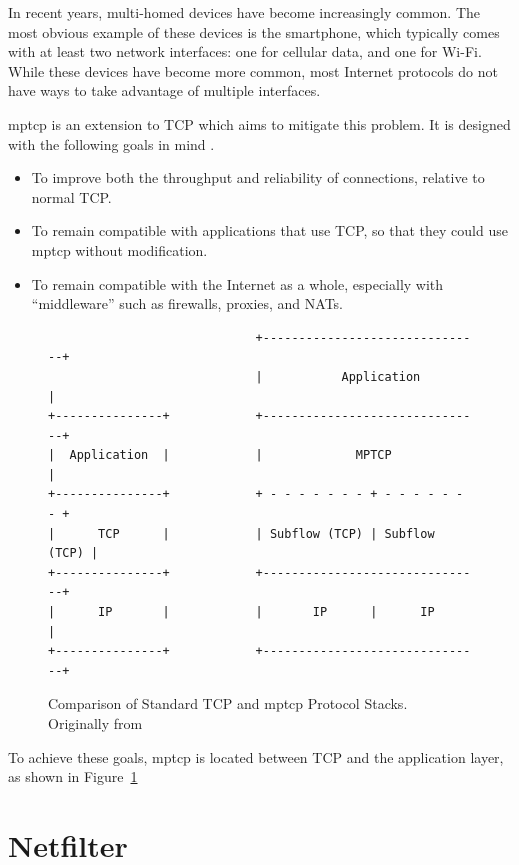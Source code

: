 \documentclass{cwru}
\begin{document}
In recent years, multi-homed devices have become increasingly common. The most
obvious example of these devices is the smartphone, which typically comes with
at least two network interfaces: one for cellular data, and one for Wi-Fi. While
these devices have become more common, most Internet protocols do not have ways
to take advantage of multiple interfaces.

\ac{mptcp} is an extension to TCP which aims to mitigate this problem. It is
designed with the following goals in mind \cite{rfc6824}.

\begin{itemize}
  \item To improve both the throughput and reliability of connections, relative
    to normal TCP.
  \item To remain compatible with applications that use TCP, so that they could
    use \ac{mptcp} without modification.
  \item To remain compatible with the Internet as a whole, especially with
    ``middleware'' such as firewalls, proxies, and NATs.
\end{itemize}

\begin{figure}[h]
  \centering
\begin{BVerbatim}
                             +-------------------------------+
                             |           Application         |
+---------------+            +-------------------------------+
|  Application  |            |             MPTCP             |
+---------------+            + - - - - - - - + - - - - - - - +
|      TCP      |            | Subflow (TCP) | Subflow (TCP) |
+---------------+            +-------------------------------+
|      IP       |            |       IP      |      IP       |
+---------------+            +-------------------------------+
\end{BVerbatim}
\caption[Comparison of TCP and \acs{mptcp} Protocol Stacks]{Comparison of
  Standard TCP and \ac{mptcp} Protocol Stacks. Originally from \cite{rfc6824}}
  \label{fig:layers}
\end{figure}

To achieve these goals, \ac{mptcp} is located between TCP and the application layer,
as shown in Figure~\ref{fig:layers}

\section{Netfilter}
\end{document}
